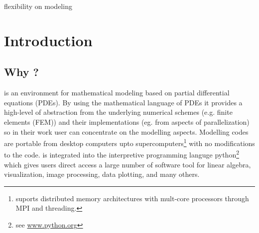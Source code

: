 
%
%
%

flexibility on modeling
\chapter{Introduction}
\label{CHAP INTRO}
\section{Why \esc?}
\esc is an environment for mathematical modeling based on partial differential equations (PDEs).
By using the mathematical language of PDEs
it provides a high-level of abstraction from the underlying numerical schemes (e.g. finite elements (FEM)) and their implementations (eg. from aspects of parallelization) so in their work user can concentrate on the modelling aspects.
Modelling codes are portable from desktop computers upto supercomputers\footnote{\esc suports distributed memory architectures with mult-core processors through MPI and threading.} with no modifications to the code. \esc is 
integrated into the interpretive programming languge python\footnote{see \url{www.python.org} } which gives users direct access a large number
of software tool for linear algebra, visualization, image processing, data plotting, and many others.

